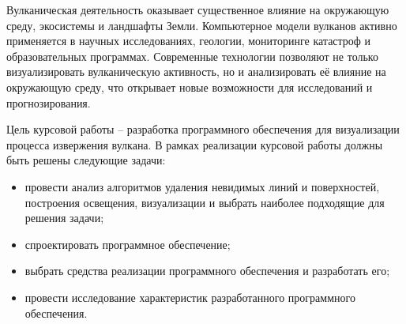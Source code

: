 
Вулканическая деятельность оказывает существенное влияние на окружающую среду, экосистемы и ландшафты Земли. Компьютерное модели вулканов активно применяется в научных исследованиях, геологии, мониторинге катастроф и образовательных программах. Современные технологии позволяют не только визуализировать вулканическую активность, но и анализировать её влияние на окружающую среду, что открывает новые возможности для исследований и прогнозирования.\cite{lit1}

Цель курсовой работы -- разработка программного обеспечения для визуализации процесса извержения вулкана.
В рамках реализации курсовой работы должны быть решены следующие задачи:
\begin{itemize}
	\item провести анализ алгоритмов  удаления невидимых линий и поверхностей, построения освещения, визуализации и выбрать наиболее подходящие для решения задачи;
	\item спроектировать программное обеспечение;
	\item выбрать средства реализации программного обеспечения и разработать его;
	\item провести исследование характеристик разработанного программного обеспечения.
\end{itemize}


